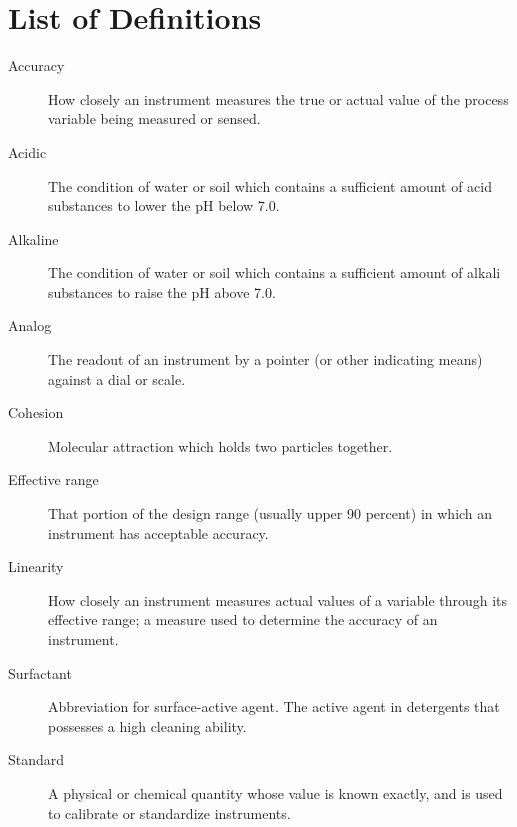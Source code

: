 \chapter*{List of Definitions}
\begin{description}
\item[Accuracy]{How closely an instrument measures the true or actual value of the process variable being measured or sensed.}
\item[Acidic]{The condition of water or soil which contains a sufficient amount of acid substances to lower the pH below 7.0.}
\item[Alkaline]{The condition of water or soil which contains a sufficient amount of alkali substances to raise the pH above 7.0.}
\item[Analog]{The readout of an instrument by a pointer (or other indicating means) against a dial or scale.}
\item[Cohesion]{Molecular attraction which holds two particles together.}
\item[Effective range]{That portion of the design range (usually upper 90 percent) in which an instrument has acceptable accuracy.}
\item[Linearity]{How closely an instrument measures actual values of a variable through its effective range; a measure used to determine the accuracy of an instrument.}
\item[Surfactant]{Abbreviation for surface-active agent. The active agent in detergents that possesses a high cleaning ability.}
\item[Standard]{A physical or chemical quantity whose value is known exactly, and is used to calibrate or standardize instruments.}
\end{description}
\pagebreak